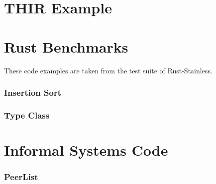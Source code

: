 \section{THIR Example}



\clearpage
\section{Rust Benchmarks}

These code examples are taken from the test suite of Rust-Stainless.

\subsubsection{Insertion Sort}

\hspace{5mm}


\hspace{5mm}

\subsubsection{Type Class}



\clearpage
\section{Informal Systems Code}

\subsubsection{PeerList}

